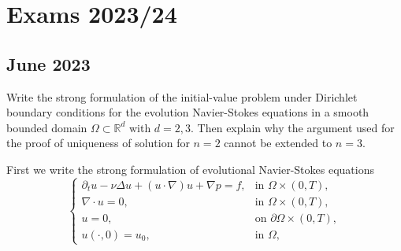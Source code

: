 \section{Exams 2023/24}
\subsection{June 2023}
\begin{exercise}
    Write the strong formulation of the initial-value problem under Dirichlet boundary conditions for the evolution Navier-Stokes equations in a smooth bounded domain $\Omega \subset \mathbb{R}^d$ with $d=2,3$. Then explain why the argument used for the proof of uniqueness of solution for \(n = 2\) cannot be extended to \(n = 3\).
\end{exercise}
First we write the strong formulation of evolutional Navier-Stokes equations
\begin{equation*}
    \begin{cases}
        \partial_t u - \nu \Delta u + (u \cdot \nabla)u + \nabla p = f, & \text{in } \Omega \times (0,T), \\
        \nabla \cdot u = 0, & \text{in } \Omega \times (0,T), \\
        u = 0, & \text{on } \partial \Omega \times (0,T), \\
        u(\cdot,0) = u_0, & \text{in } \Omega,
    \end{cases}
\end{equation*}

